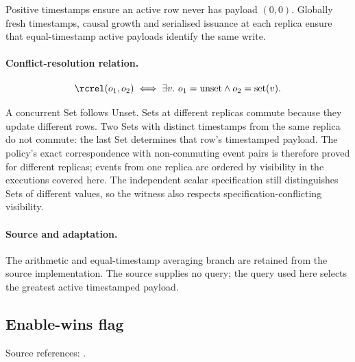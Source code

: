 Positive timestamps ensure an active row never has payload $(0,0)$. Globally fresh timestamps, causal growth and serialised issuance at each replica ensure that equal-timestamp active payloads identify the same write.


\paragraph{Conflict-resolution relation.}
\[
\rcrel(o_1,o_2)\iff\exists v.\ o_1=\mathrm{unset}\land o_2=\mathrm{set}(v).
\]

A concurrent Set follows Unset. Sets at different replicas commute because
they update different rows. Two Sets with distinct timestamps from the same
replica do not commute: the last Set determines that row's timestamped
payload. The policy's exact correspondence with non-commuting event pairs is
therefore proved for different replicas; events from one replica are ordered
by visibility in the executions covered here. The independent scalar
specification still distinguishes Sets of different values, so the witness
also respects specification-conflicting visibility.


\paragraph{Source and adaptation.}
The arithmetic and equal-timestamp averaging branch are retained from the source implementation. The source supplies no query; the query used here selects the greatest active timestamped payload.


\subsection{Enable-wins flag}
\label{app:dt-enable-wins-flag}

\noindent Source references: \cite{neem}.






